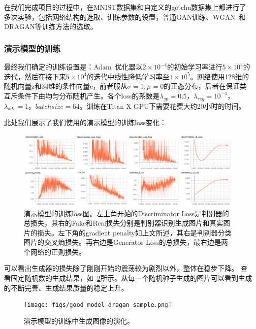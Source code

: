 \documentclass[a4paper,12pt,UTF8]{ctexart}
\newcommand{\kai}{\CJKfamily{zhkai}}	%
\begin{document}
在我们完成项目的过程中，在MNIST数据集和自定义的getchu数据集上都进行了多次实验，包括网络结构的选取、训练参数的设置，普通GAN训练、WGAN~\cite{2017arXiv170107875A}和DRAGAN等训练方法的选取。

\subsubsection{演示模型的训练}

最终我们确定的训练设置是：Adam~\cite{Kingma2014Adam}优化器以$2 \times 10^{-4}$的初始学习率进行$5 \times 10^{4}$的迭代，然后在接下来$5 \times 10^{4}$的迭代中线性降低学习率至$1 \times 10^{5}$。网络使用128维的随机向量z和34维的条件向量c，前者服从$\sigma=1, \mu=0$的正态分布，后者在保证类互斥条件下由均匀分布随机产生。各个loss的系数是$\lambda_{gp}=0.5$，$\lambda_{reg}=10^{-4}$，$\lambda_{adv}=1$。$batchsize=64$。训练在Titan X GPU下需要花费大约20小时的时间。

此处我们展示了我们使用的演示模型的训练loss变化：

\begin{figure}[H]
  \centering
  \includegraphics[width=1\linewidth]{figs/good_model_dragan.png}
  \caption{\kai 演示模型的训练loss图。左上角开始的Discriminator Loss是判别器的总损失，其右的Fake和Real损失分别是判别器识别生成图片和真实图片的损失。左下角的gradient penalty如上文所述，其右是判别器分类图片的交叉熵损失。再右边是Generator Loss的总损失，最右边是两个网络的正则损失。}
  \label{fig:goodmodel_dragan}
\end{figure}

可以看出生成器的损失除了刚刚开始的震荡较为剧烈以外，整体在稳步下降。
查看固定随机数的生成结果，如~\ref{fig:dragan_evolve}所示。从每一个随机种子生成的图片可以看到生成的不断完善、生成结果质量的稳定上升。

\begin{figure}[H]
  \centering
  \texttt{[image: figs/good\_model\_dragan\_sample.png]}
  \caption{\kai 演示模型的训练中生成图像的演化。}
  \label{fig:dragan_evolve}
\end{figure}
\end{document}
